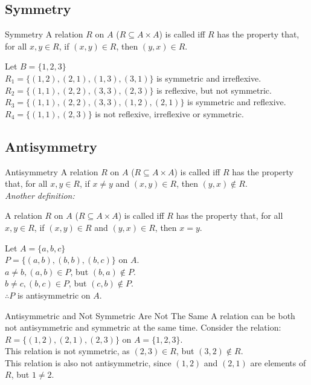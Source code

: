 \documentclass[../notes.tex]{subfiles}
\begin{document}
			\subsection{Symmetry}
				\begin{definition}{Symmetry}
					A relation $R$ on $A$ ($R \subseteq A \times A$) is called  iff $R$ has the property that, for all $x, y \in R$, if $(x, y) \in R$, then $(y, x) \in R$.
				\end{definition}
				\begin{example}[width=0.75\textwidth]
					Let $B = \{1, 2, 3\}$\\
					$R_{1} = \bigl\{(1, 2), (2, 1), (1, 3), (3, 1)\bigr\}$ is symmetric and irreflexive.\\
					$R_{2} = \bigl\{(1, 1), (2, 2), (3, 3), (2, 3)\bigr\}$ is reflexive, but not symmetric.\\
					$R_{3} = \bigl\{(1, 1), (2, 2), (3, 3), (1, 2), (2, 1)\bigr\}$ is symmetric and reflexive.\\
					$R_{4} = \bigl\{(1, 1), (2, 3)\bigr\}$ is not reflexive, irreflexive or symmetric.
				\end{example}
				\pagebreak
			\subsection{Antisymmetry}
				\begin{definition}{Antisymmetry}
					A relation $R$ on $A$ ($R \subseteq A \times A$) is called  iff $R$ has the property that, for all $x, y \in R$, if $x \neq y$ and $(x, y) \in R$, then $(y, x) \notin R$.\\
					\emph{Another definition:}
						\begin{indentparagraph}
							A relation $R$ on $A$ ($R \subseteq A \times A$) is called  iff $R$ has the property that, for all $x, y \in R$, if $(x, y) \in R$ and $(y, x) \in R$, then $x = y$.
						\end{indentparagraph}
				\end{definition}
				\begin{example}[width=0.36\textwidth]
					Let $A = \{a, b, c\}$\\
					$P = \bigl\{(a, b), (b, b), (b, c)\bigr\}$ on $A$.\\
					$a \neq b, (a, b) \in P$, but $(b, a) \notin P$.\\
					$b \neq c, (b, c) \in P$, but $(c, b) \notin P$.\\
					$\therefore P$ is antisymmetric on $A$.
				\end{example}
				\begin{sidenote}{Antisymmetric and Not Symmetric Are Not The Same}
					A relation can be both not antisymmetric and symmetric at the same time. Consider the relation:\\
					$R = \{(1, 2), (2, 1), (2, 3)\}$ on $A = \{1, 2, 3\}$.\\
					This relation is not symmetric, as $(2, 3) \in R$, but $(3, 2) \notin R$.\\
					This relation is also not antisymmetric, since $(1, 2)$ and $(2, 1)$ are elements of $R$, but $1 \neq 2$.
				\end{sidenote}
\end{document}
